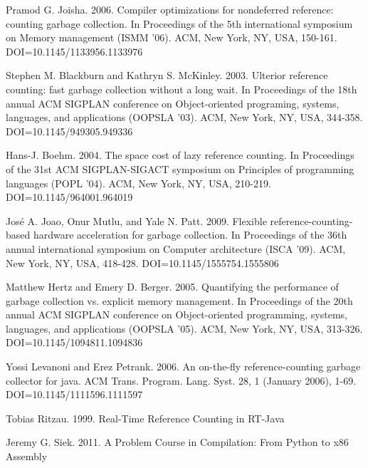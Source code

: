 \documentclass{sigplanconf}
\begin{document}
\begin{thebibliography}{}
\softraggedright
{}
Pramod G. Joisha. 2006. Compiler optimizations for nondeferred reference: counting garbage collection. In Proceedings of the 5th international symposium on Memory management (ISMM '06). ACM, New York, NY, USA, 150-161. DOI=10.1145/1133956.1133976

Stephen M. Blackburn and Kathryn S. McKinley. 2003. Ulterior reference counting: fast garbage collection without a long wait. In Proceedings of the 18th annual ACM SIGPLAN conference on Object-oriented programing, systems, languages, and applications (OOPSLA '03). ACM, New York, NY, USA, 344-358. DOI=10.1145/949305.949336

Hans-J. Boehm. 2004. The space cost of lazy reference counting. In Proceedings of the 31st ACM SIGPLAN-SIGACT symposium on Principles of programming languages (POPL '04). ACM, New York, NY, USA, 210-219. DOI=10.1145/964001.964019 

José A. Joao, Onur Mutlu, and Yale N. Patt. 2009. Flexible reference-counting-based hardware acceleration for garbage collection. In Proceedings of the 36th annual international symposium on Computer architecture (ISCA '09). ACM, New York, NY, USA, 418-428. DOI=10.1145/1555754.1555806

Matthew Hertz and Emery D. Berger. 2005. Quantifying the performance of garbage collection vs. explicit memory management. In Proceedings of the 20th annual ACM SIGPLAN conference on Object-oriented programming, systems, languages, and applications (OOPSLA '05). ACM, New York, NY, USA, 313-326. DOI=10.1145/1094811.1094836  

Yossi Levanoni and Erez Petrank. 2006. An on-the-fly reference-counting garbage collector for java. ACM Trans. Program. Lang. Syst. 28, 1 (January 2006), 1-69. DOI=10.1145/1111596.1111597 

Tobias Ritzau. 1999.  Real-Time Reference Counting in RT-Java

Jeremy G. Siek. 2011.  A Problem Course in Compilation: From Python to x86 Assembly

\end{thebibliography}
\end{document}
